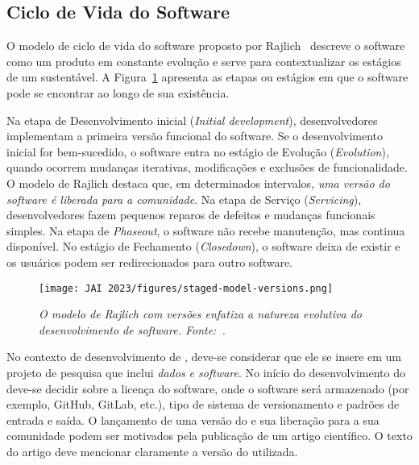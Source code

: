 \subsection{Ciclo de Vida do Software}

O modelo de ciclo de vida do software proposto por Rajlich~\cite{rajlich:staged:2000} 
descreve o software como um produto em constante evolução
e serve para contextualizar os estágios de um \RSw sustentável.
%
A Figura~\ref{fig:staged:model} apresenta as etapas ou estágios em que o software pode se encontrar ao longo de sua existência. 

Na etapa de Desenvolvimento inicial (\textit{Initial development}), desenvolvedores implementam a primeira versão funcional do software.
Se o desenvolvimento inicial for bem-sucedido, o software entra no estágio de Evolução (\textit{Evolution}), quando ocorrem mudanças iterativas, modificações e exclusões de funcionalidade. 
O modelo de Rajlich destaca que, em determinados intervalos, \textit{uma versão do software é liberada para a comunidade}. 
Na etapa de Serviço (\textit{Servicing}), desenvolvedores fazem pequenos reparos de defeitos e mudanças funcionais simples.
Na etapa de \textit{Phaseout}, o software não recebe manutenção, mas continua disponível. No estágio de Fechamento (\textit{Closedown}), o software deixa de existir e os usuários podem ser redirecionados para outro software.

\begin{figure}[tbp]
    \centering
    \texttt{[image: JAI 2023/figures/staged-model-versions.png]}
    \caption{\textit{O modelo de Rajlich com versões enfatiza a natureza evolutiva do desenvolvimento de software. Fonte:~\cite{rajlich:staged:2000}. }}
    \label{fig:staged:model}
\end{figure}

No contexto de desenvolvimento de \RS, 
deve-se considerar que ele se insere em um projeto de pesquisa que inclui \textit{dados e software}. 
No início do desenvolvimento do \RSw deve-se decidir
sobre a licença do software, onde o software será armazenado (por exemplo, GitHub, GitLab, etc.), tipo de sistema de versionamento e padrões de entrada e saída.
%
O lançamento de uma versão do \RSw e sua liberação para a sua comunidade podem ser motivados pela publicação de um artigo científico. O texto do artigo deve mencionar claramente a versão do \RSw utilizada. 

